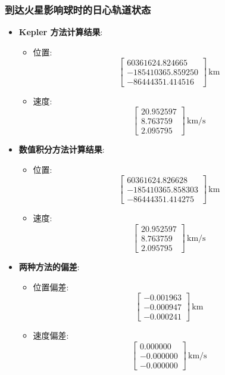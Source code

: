 \documentclass[12pt,a4paper]{article}
\begin{document}
\subsubsection{到达火星影响球时的日心轨道状态}
\begin{itemize}
    \item \textbf{Kepler 方法计算结果}:
    \begin{itemize}
        \item 位置: 
        \[
        \begin{bmatrix}
            60361624.824665 \\ -185410365.859250 \\ -86444351.414516
        \end{bmatrix} \, \text{km}
        \]
        \item 速度:         
        \[
        \begin{bmatrix}
            20.952597 \\ 8.763759 \\ 2.095795
        \end{bmatrix} \, \text{km/s}
        \]
    \end{itemize}
    
    \item \textbf{数值积分方法计算结果}:
    \begin{itemize}
        \item 位置: 
        \[
        \begin{bmatrix}
            60361624.826628 \\ -185410365.858303 \\ -86444351.414275
        \end{bmatrix} \, \text{km}
        \]
        \item 速度: 
        \[
        \begin{bmatrix}
            20.952597 \\ 8.763759 \\ 2.095795
        \end{bmatrix} \, \text{km/s}
        \]
    \end{itemize}
    
    \item \textbf{两种方法的偏差}:
    \begin{itemize}
        \item 位置偏差: 
        \[
        \begin{bmatrix}
            -0.001963 \\ -0.000947 \\ -0.000241
        \end{bmatrix} \, \text{km}
        \]
        \item 速度偏差: 
        \[
        \begin{bmatrix}
            0.000000 \\ -0.000000 \\ -0.000000
        \end{bmatrix} \, \text{km/s}
        \]
    \end{itemize}
\end{itemize}
\end{document}
